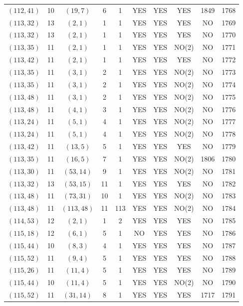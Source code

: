 \begin{longtable}{|c|c|c|c|c|c|c|c|c|c|}
$(112, 41)$ & 10 & $(19, 7)$ & 6 & 1 & YES & YES & YES & 1849 & 1768\\
$(113, 32)$ & 13 & $(2, 1)$ & 1 & 1 & YES & YES & YES & NO & 1769\\
$(113, 32)$ & 13 & $(2, 1)$ & 1 & 1 & YES & YES & YES & NO & 1770\\
$(113, 35)$ & 11 & $(2, 1)$ & 1 & 1 & YES & YES & NO(2) & NO & 1771\\
$(113, 42)$ & 11 & $(2, 1)$ & 1 & 1 & YES & YES & YES & NO & 1772\\
$(113, 35)$ & 11 & $(3, 1)$ & 2 & 1 & YES & YES & NO(2) & NO & 1773\\
$(113, 35)$ & 11 & $(3, 1)$ & 2 & 1 & YES & YES & NO(2) & NO & 1774\\
$(113, 48)$ & 11 & $(3, 1)$ & 2 & 1 & YES & YES & NO(2) & NO & 1775\\
$(113, 48)$ & 11 & $(4, 1)$ & 3 & 1 & YES & YES & NO(2) & NO & 1776\\
$(113, 24)$ & 11 & $(5, 1)$ & 4 & 1 & YES & YES & NO(2) & NO & 1777\\
$(113, 24)$ & 11 & $(5, 1)$ & 4 & 1 & YES & YES & NO(2) & NO & 1778\\
$(113, 42)$ & 11 & $(13, 5)$ & 5 & 1 & YES & YES & YES & NO & 1779\\
$(113, 35)$ & 11 & $(16, 5)$ & 7 & 1 & YES & YES & NO(2) & 1806 & 1780\\
$(113, 30)$ & 11 & $(53, 14)$ & 9 & 1 & YES & YES & NO(2) & NO & 1781\\
$(113, 32)$ & 13 & $(53, 15)$ & 11 & 1 & YES & YES & YES & NO & 1782\\
$(113, 48)$ & 11 & $(73, 31)$ & 10 & 1 & YES & YES & NO(2) & NO & 1783\\
$(113, 48)$ & 11 & $(113, 48)$ & 11 & 113 & YES & YES & NO(2) & NO & 1784\\
$(114, 53)$ & 12 & $(2, 1)$ & 1 & 2 & YES & YES & YES & NO & 1785\\
$(115, 18)$ & 12 & $(6, 1)$ & 5 & 1 & NO & YES & YES & NO & 1786\\
$(115, 44)$ & 10 & $(8, 3)$ & 4 & 1 & YES & YES & YES & NO & 1787\\
$(115, 52)$ & 11 & $(9, 4)$ & 5 & 1 & YES & YES & YES & NO & 1788\\
$(115, 26)$ & 11 & $(11, 4)$ & 5 & 1 & YES & YES & YES & NO & 1789\\
$(115, 44)$ & 10 & $(11, 4)$ & 5 & 1 & YES & YES & NO(2) & NO & 1790\\
$(115, 52)$ & 11 & $(31, 14)$ & 8 & 1 & YES & YES & YES & 1717 & 1791\\

\end{longtable}
